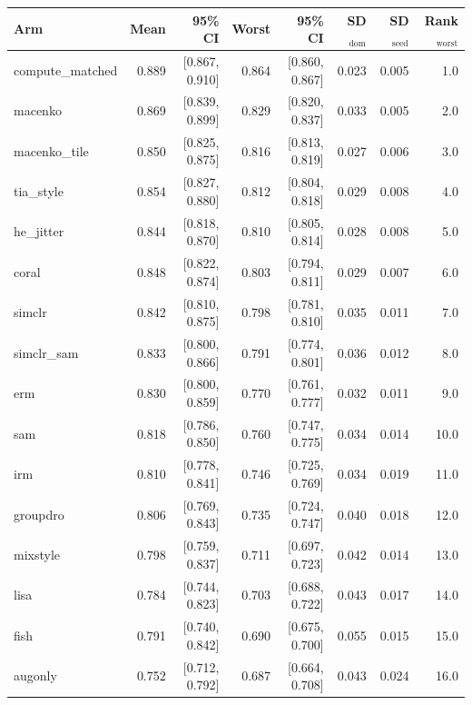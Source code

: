 \begin{tabular}{lrrrrrrr}
\toprule
Arm & Mean & 95\% CI & Worst & 95\% CI & SD$_\text{dom}$ & SD$_\text{seed}$ & Rank$_\text{worst}$ \\
\midrule
compute\_matched & 0.889 & [0.867, 0.910] & 0.864 & [0.860, 0.867] & 0.023 & 0.005 & 1.0 \\
macenko & 0.869 & [0.839, 0.899] & 0.829 & [0.820, 0.837] & 0.033 & 0.005 & 2.0 \\
macenko\_tile & 0.850 & [0.825, 0.875] & 0.816 & [0.813, 0.819] & 0.027 & 0.006 & 3.0 \\
tia\_style & 0.854 & [0.827, 0.880] & 0.812 & [0.804, 0.818] & 0.029 & 0.008 & 4.0 \\
he\_jitter & 0.844 & [0.818, 0.870] & 0.810 & [0.805, 0.814] & 0.028 & 0.008 & 5.0 \\
coral & 0.848 & [0.822, 0.874] & 0.803 & [0.794, 0.811] & 0.029 & 0.007 & 6.0 \\
simclr & 0.842 & [0.810, 0.875] & 0.798 & [0.781, 0.810] & 0.035 & 0.011 & 7.0 \\
simclr\_sam & 0.833 & [0.800, 0.866] & 0.791 & [0.774, 0.801] & 0.036 & 0.012 & 8.0 \\
erm & 0.830 & [0.800, 0.859] & 0.770 & [0.761, 0.777] & 0.032 & 0.011 & 9.0 \\
sam & 0.818 & [0.786, 0.850] & 0.760 & [0.747, 0.775] & 0.034 & 0.014 & 10.0 \\
irm & 0.810 & [0.778, 0.841] & 0.746 & [0.725, 0.769] & 0.034 & 0.019 & 11.0 \\
groupdro & 0.806 & [0.769, 0.843] & 0.735 & [0.724, 0.747] & 0.040 & 0.018 & 12.0 \\
mixstyle & 0.798 & [0.759, 0.837] & 0.711 & [0.697, 0.723] & 0.042 & 0.014 & 13.0 \\
lisa & 0.784 & [0.744, 0.823] & 0.703 & [0.688, 0.722] & 0.043 & 0.017 & 14.0 \\
fish & 0.791 & [0.740, 0.842] & 0.690 & [0.675, 0.700] & 0.055 & 0.015 & 15.0 \\
augonly & 0.752 & [0.712, 0.792] & 0.687 & [0.664, 0.708] & 0.043 & 0.024 & 16.0 \\
\bottomrule
\end{tabular}
